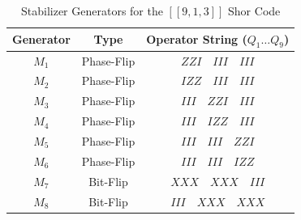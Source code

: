 \begin{table}[ht]
\centering
\caption{Stabilizer Generators for the $[[9, 1, 3]]$ Shor Code}
\label{tab:shor_stabilizers}
\begin{tabular}{@{}ccc@{}}
\toprule
\textbf{Generator} & \textbf{Type} & \textbf{Operator String} ($Q_1 \dots Q_9$) \\ \midrule
$M_1$ & Phase-Flip & $Z Z I \quad I I I \quad I I I$ \\
$M_2$ & Phase-Flip & $I Z Z \quad I I I \quad I I I$ \\
$M_3$ & Phase-Flip & $I I I \quad Z Z I \quad I I I$ \\
$M_4$ & Phase-Flip & $I I I \quad I Z Z \quad I I I$ \\
$M_5$ & Phase-Flip & $I I I \quad I I I \quad Z Z I$ \\
$M_6$ & Phase-Flip & $I I I \quad I I I \quad I Z Z$ \\ \addlinespace
$M_7$ & Bit-Flip   & $X X X \quad X X X \quad I I I$ \\
$M_8$ & Bit-Flip   & $I I I \quad X X X \quad X X X$ \\ \bottomrule
\end{tabular}
\end{table}

%
%
%
%
%
%
%
%

